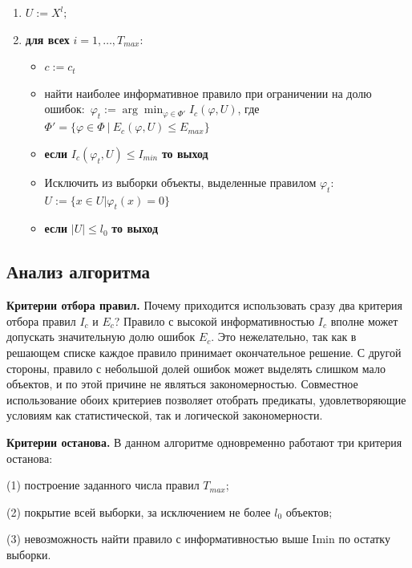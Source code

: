 \begin{enumerate}
    \item $U := X^l;$
    \item \textbf{для всех} $i = 1, \dots, T_{max}$:
          \begin{itemize}
              \item {} $c := c_t$
              \item найти наиболее информативное правило при ограничении на долю ошибок:\
                    $\varphi_t := \arg\min_{\varphi \in \Phi'} I_c(\varphi, U)$, где $\Phi' = \{ \varphi \in \Phi \ | \ E_c(\varphi, U) \leq E_{max} \}$
                    
              \item \textbf{если} $I_c(\varphi_t, U) \leq I_{min}$ \textbf{то выход}
              \item Исключить из выборки объекты, выделенные правилом $\varphi_t$:
                    $U := \{x \in U | \varphi_t(x) = 0\}$
                    
              \item \textbf{если} $|U| \leq l_0$ \textbf{то выход}
          \end{itemize}
\end{enumerate}

\subsection{Анализ алгоритма}

\textbf{Критерии отбора правил.} Почему приходится использовать сразу два критерия
отбора правил $I_c$ и $E_c$? Правило с высокой информативностью $I_c$ вполне может допускать значительную долю ошибок $E_c$. Это нежелательно, так как в решающем списке каждое правило принимает окончательное решение. С другой стороны, правило с небольшой долей ошибок может выделять слишком мало объектов,
и по этой причине не являться закономерностью. Совместное использование обоих
критериев позволяет отобрать предикаты, удовлетворяющие условиям как статистической, так и логической закономерности.

\textbf{Критерии останова.} В данном алгоритме одновременно работают три критерия останова: 

(1) построение заданного числа правил $T_{max}$; 

(2) покрытие всей выборки, за исключением не более $l_0$ объектов; 

(3) невозможность найти правило с информативностью выше Imin по остатку выборки.

